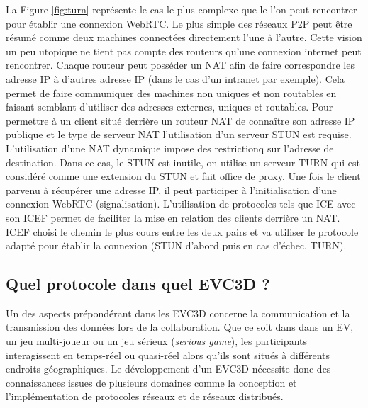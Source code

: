 La Figure \ref{fig:turn} représente le cas le plus complexe que le l'on peut 
rencontrer pour établir une connexion WebRTC. Le plus simple des réseaux P2P 
peut être résumé comme deux machines connectées directement l'une à l'autre. 
Cette vision un peu utopique ne tient pas compte des routeurs qu'une connexion 
internet peut rencontrer. 
Chaque routeur peut posséder un \gls{NAT} afin de faire correspondre 
les adresse IP à d'autres adresse IP (dans le cas d'un intranet par exemple). 
Cela permet de faire communiquer des machines non uniques et non routables en 
faisant semblant d'utiliser des adresses externes, uniques et routables. 
Pour permettre à un client situé derrière un routeur \gls{NAT} de connaître son 
adresse IP publique et le type de serveur \gls{NAT} l'utilisation d'un serveur 
\gls{STUN} est requise. 
L'utilisation d'une \gls{NAT} dynamique impose des restrictionq sur l'adresse de  
destination. Dans ce cas, le \gls{STUN} est inutile, on utilise un serveur 
\gls{TURN} qui est considéré comme une extension du \gls{STUN} et fait office de 
proxy. 
Une fois le client parvenu à récupérer une adresse IP, il peut participer à 
l'initialisation d'une connexion WebRTC (signalisation). L'utilisation de protocoles 
tels que \gls{ICE} avec son \gls{ICEF} permet de faciliter la mise en relation des 
clients derrière un \gls{NAT}. \gls{ICEF} choisi le chemin le plus cours entre les 
deux pairs et va utiliser le protocole adapté pour établir la connexion (\gls{STUN} 
d'abord puis en cas d'échec, \gls{TURN}).



\subsection{Quel protocole dans quel EVC3D ?}
Un des aspects prépondérant dans les \gls{EVC3D} concerne la communication et 
la transmission des données lors de la collaboration. Que ce soit dans dans un 
\gls{EV}, un jeu multi-joueur ou un jeu sérieux (\textit{serious game}), les 
participants interagissent en temps-réel ou quasi-réel alors qu'ils sont situés à 
différents endroits géographiques. 
Le développement d'un \gls{EVC3D} nécessite donc des connaissances issues de 
plusieurs domaines comme la conception et l'implémentation de protocoles 
réseaux et de réseaux distribués.

